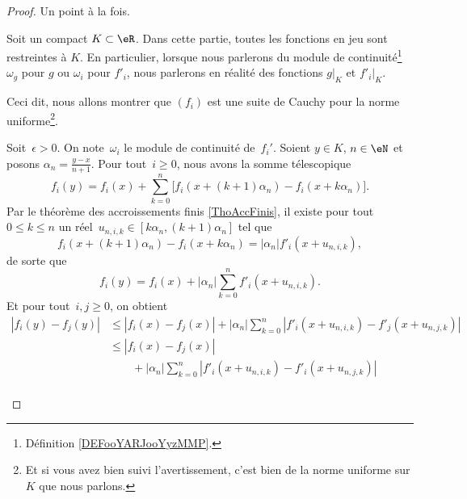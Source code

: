 \begin{proof}
	Un point à la fois.
	\begin{subproof}
		Soit un compact \( K\subset \eR\). Dans cette partie, toutes les fonctions en jeu sont restreintes à \( K\). En particulier, lorsque nous parlerons du module de continuité\footnote{Définition \ref{DEFooYARJooYyzMMP}.} \( \omega_g\) pour \( g\) ou \( \omega_i\) pour \( f'_i\), nous parlerons en réalité des fonctions \( g|_K\) et \( f'_i|_K\).

		Ceci dit, nous allons montrer que \( (f_i)\) est une suite de Cauchy pour la norme uniforme\footnote{Et si vous avez bien suivi l'avertissement, c'est bien de la norme uniforme sur \( K\) que nous parlons.}.

		Soit~\( \epsilon > 0\). On note~\( \omega_i\) le module de continuité de~\( f_i'\). Soient \( y\in K\), \( n \in \eN\) et posons \( \alpha_n = \frac{y-x}{n+1}\).
		Pour tout~\( i \geq 0\), nous avons la somme télescopique
		\begin{equation}
			f_i(y) = f_i(x) + \sum_{k=0}^n \Big[  f_i(x+(k+1)\alpha_n) - f_i(x+k\alpha_n) \Big].
		\end{equation}
		Par le théorème des accroissements finis \ref{ThoAccFinis}, il existe pour tout~\( 0\leq k\leq n\)
		un réel~\( u_{n,i,k} \in [k\alpha_n,(k+1)\alpha_n]\) tel que
		\begin{equation}
			f_i(x+(k+1)\alpha_n) - f_i(x+k\alpha_n) = |\alpha_n| f'_i(x+ u_{n,i,k}),
		\end{equation}
		de sorte que
		\begin{equation}
			f_i(y) = f_i(x) + |\alpha_n| \sum_{k=0}^n  f'_i(x+ u_{n,i,k}).
		\end{equation}
		Et pour tout~\( i,j \geq 0\), on obtient
		\begin{subequations}      \label{SUBEQSooUYFTooWPVfWt}
			\begin{align}
				\left| f_i(y) - f_j(y) \right| & \leq \left| f_i(x) - f_j(x) \right| + |\alpha_n| \sum_{k=0}^n \left| f'_i(x+ u_{n,i,k}) - f'_j(x+u_{n,j,k}) \right|                            \\
				                               & \leq | f_i(x)-f_j(x) |                                                                                                                         \\
				                               & \qquad+|\alpha_n|\sum_{k=0}^n \left| f'_i(x+ u_{n,i,k}) - f'_i(x+u_{n,j,k}) \right| \nonumber                                                  \\

\end{align}
\end{subequations}
\end{subproof}
\end{proof}

